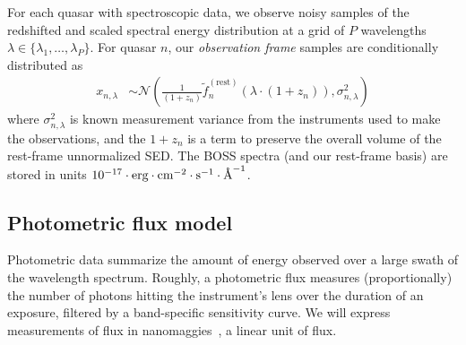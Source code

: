 \documentclass{article} %
\begin{document}
For each quasar with spectroscopic data, we observe noisy samples of the redshifted and scaled spectral energy distribution at a grid of $P$ wavelengths ${\lambda \in \{\lambda_1, \dots, \lambda_P \}}$.
For quasar $n$, our \emph{observation frame} samples are conditionally distributed as
\begin{align}
  x_{n, \lambda} 
    &\sim \mathcal{N}\left( \frac{1}{(1 + z_n)} \tilde f_n^{(\text{rest})}( \lambda \cdot (1 + z_n) ), \sigma_{n,\lambda}^2 \right)
    \label{eq:spec} 
\end{align}
where $\sigma_{n, \lambda}^2$ is known measurement variance from the instruments used to make the observations, and the $1+z_n$ is a term to preserve the overall volume of the rest-frame unnormalized SED. 
The BOSS spectra (and our rest-frame basis) are stored in units ${10^{-17} \cdot \text{erg} \cdot \text{cm}^{-2} \cdot \text{s}^{-1} \cdot \textup{\AA}^{-1}}$.  

\subsection{Photometric flux model }
Photometric data summarize the amount of energy observed over a large swath of the wavelength spectrum. 
Roughly, a photometric flux measures (proportionally) the number of photons hitting the instrument's lens over the duration of an exposure, filtered by a band-specific sensitivity curve. 
We will express measurements of flux in nanomaggies~\cite{sdssnanomaggies}, a linear unit of flux. 
\end{document}
